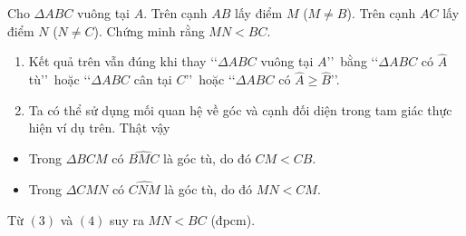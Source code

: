 \begin{vd}%
	Cho $\Delta ABC$ vuông tại $A$. Trên cạnh $AB$ lấy điểm $M$ ($M \neq B$). Trên cạnh $AC$ lấy điểm $N$ ($N \neq C$). Chứng minh rằng $MN<BC$.

\end{vd}

\begin{note}
	\hspace{0.5cm}
	\begin{enumerate}
		\item Kết quả trên vẫn đúng khi thay \lq\lq $\Delta ABC$ vuông tại $A$\rq\rq\ bằng \lq\lq $\Delta ABC$ có $\widehat{A}$ tù\rq\rq\ hoặc \lq\lq $\Delta ABC$ cân tại $C$\rq\rq\ hoặc \lq\lq $\Delta ABC$ có $\widehat{A} \ge \widehat{B}$\rq\rq.
		\item Ta có thể sử dụng mối quan hệ về góc và cạnh đối diện trong tam giác thực hiện ví dụ trên. Thật vậy			
	\end{enumerate}
	\begin{itemize}
		\item Trong $\Delta BCM$ có $\widehat{BMC}$ là góc tù, do đó $CM<CB$. 
		\item Trong $\Delta CMN$ có $\widehat{CNM}$ là góc tù, do đó $MN<CM$. 
	\end{itemize}
	Từ $(3)$ và $(4)$ suy ra $MN<BC$ (đpcm).
\end{note}


